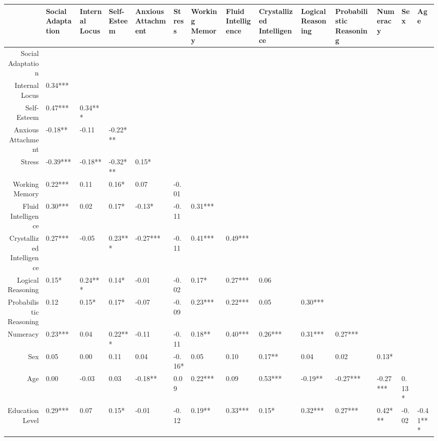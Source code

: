 \begin{table}[ht]
\centering
\begin{tabular}{rlllllllllllll}
  \hline
 & Social Adaptation & Internal Locus & Self-Esteem & Anxious Attachment & Stress & Working Memory & Fluid Intelligence & Crystallized Intelligence & Logical Reasoning & Probabilistic Reasoning & Numeracy & Sex & Age \\ 
  \hline
Social Adaptation &  &  &  &  &  &  &  &  &  &  &  &  &  \\ 
  Internal Locus &  0.34***  &  &  &  &  &  &  &  &  &  &  &  &  \\ 
  Self-Esteem &  0.47***  &  0.34***  &  &  &  &  &  &  &  &  &  &  &  \\ 
  Anxious Attachment & -0.18**   & -0.11     & -0.22***  &  &  &  &  &  &  &  &  &  &  \\ 
  Stress & -0.39***  & -0.18**   & -0.32***  &  0.15*    &  &  &  &  &  &  &  &  &  \\ 
  Working Memory &  0.22***  &  0.11     &  0.16*    &  0.07     & -0.01     &  &  &  &  &  &  &  &  \\ 
  Fluid Intelligence &  0.30***  &  0.02     &  0.17*    & -0.13*    & -0.11     &  0.31***  &  &  &  &  &  &  &  \\ 
  Crystallized Intelligence &  0.27***  & -0.05     &  0.23***  & -0.27***  & -0.11     &  0.41***  &  0.49***  &  &  &  &  &  &  \\ 
  Logical Reasoning &  0.15*    &  0.24***  &  0.14*    & -0.01     & -0.02     &  0.17*    &  0.27***  &  0.06     &  &  &  &  &  \\ 
  Probabilistic Reasoning &  0.12     &  0.15*    &  0.17*    & -0.07     & -0.09     &  0.23***  &  0.22***  &  0.05     &  0.30***  &  &  &  &  \\ 
  Numeracy &  0.23***  &  0.04     &  0.22***  & -0.11     & -0.11     &  0.18**   &  0.40***  &  0.26***  &  0.31***  &  0.27***  &  &  &  \\ 
  Sex &  0.05     &  0.00     &  0.11     &  0.04     & -0.16*    &  0.05     &  0.10     &  0.17**   &  0.04     &  0.02     &  0.13*    &  &  \\ 
  Age &  0.00     & -0.03     &  0.03     & -0.18**   &  0.09     &  0.22***  &  0.09     &  0.53***  & -0.19**   & -0.27***  & -0.27***  &  0.13*    &  \\ 
  Education Level &  0.29***  &  0.07     &  0.15*    & -0.01     & -0.12     &  0.19**   &  0.33***  &  0.15*    &  0.32***  &  0.27***  &  0.42***  & -0.02     & -0.41***  \\ 
   \hline
\end{tabular}
\end{table}

